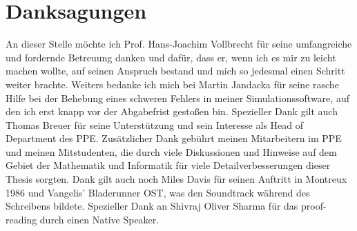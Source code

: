 \documentclass[Bachelorarbeit.tex]{subfiles}
\begin{document}
\chapter*{Danksagungen}
An dieser Stelle möchte ich Prof. Hans-Joachim Vollbrecht für seine umfangreiche und fordernde Betreuung danken und dafür, dass er, wenn ich es mir zu leicht machen wollte, auf seinen Anspruch bestand und mich so jedesmal einen Schritt weiter brachte. Weiters bedanke ich mich bei Martin Jandacka für seine rasche Hilfe bei der Behebung eines schweren Fehlers in meiner Simulationssoftware, auf den ich erst knapp vor der Abgabefrist gestoßen bin. Spezieller Dank gilt auch Thomas Breuer für seine Unterstützung und sein Interesse als Head of Department des PPE. Zusätzlicher Dank gebührt meinen Mitarbeitern im PPE und meinen Mitstudenten, die durch viele Diskussionen und Hinweise auf dem Gebiet der Mathematik und Informatik für viele Detailverbesserungen dieser Thesis sorgten. Dank gilt auch noch Miles Davis für seinen Auftritt in Montreux 1986 und Vangelis' Bladerunner OST, was den Soundtrack während des Schreibens bildete. Spezieller Dank an Shivraj Oliver Sharma für das proof-reading durch einen Native Speaker.
\end{document}

